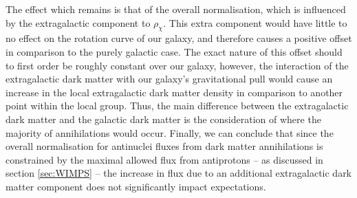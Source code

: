The effect which remains is that of the overall normalisation, which is influenced by the extragalactic component to $\rho_\chi$. This extra component would have little to no effect on the rotation curve of our galaxy, and therefore causes a positive offset in comparison to the purely galactic case. The exact nature of this offset should to first order be roughly constant over our galaxy, however, the interaction of the extragalactic dark matter with our galaxy's gravitational pull would cause an increase in the local extragalactic dark matter density in comparison to another point within the local group. Thus, the main difference between the extragalactic dark matter and the galactic dark matter is the consideration of where the majority of annihilations would occur. Finally, we can conclude that since the overall normalisation for antinuclei fluxes from dark matter annihilations is constrained by the maximal allowed flux from antiprotons -- as discussed in section \ref{sec:WIMPS} -- the increase in flux due to an additional extragalactic dark matter component does not significantly impact expectations. \\

